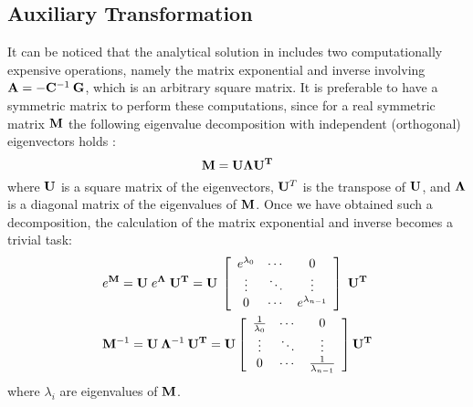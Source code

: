 \subsection{Auxiliary Transformation} \label{sec:ce-auxiliary}
It can be noticed that the analytical solution in  includes two computationally expensive operations, namely the matrix exponential and inverse involving \mbox{$\mathbf{A} = - \mathbf{C}^{-1} \: \mathbf{G}$}, which is an arbitrary square matrix. It is preferable to have a symmetric matrix to perform these computations, since for a real symmetric matrix $\mathbf{M}$ the following eigenvalue decomposition with independent (orthogonal) eigenvectors holds \cite{press2007}:
\begin{equation} \label{eq:eigenvalue-decomposition}
  \mathbf{M} = \mathbf{U} \mathbf{\Lambda} \mathbf{U}^{\mathbf{T}}
\end{equation}
where $\mathbf{U}$ is a square matrix of the eigenvectors, $\mathbf{U}^T$ is the transpose of $\mathbf{U}$, and $\mathbf{\Lambda}$ is a diagonal matrix of the eigenvalues of $\mathbf{M}$. Once we have obtained such a decomposition, the calculation of the matrix exponential and inverse becomes a trivial task:
\begin{align*}
  & e^{\mathbf{M}} = \mathbf{U} \; e^{\mathbf{\Lambda}} \; \mathbf{U}^{\mathbf{T}} = \mathbf{U}\: \left[
      \begin{array}{ccc}
        e^{\lambda_0} & \cdots & 0 \\
        \vdots & \ddots & \vdots \\
        0 & \cdots & e^{\lambda_{n - 1}}
      \end{array}
    \right] \; \mathbf{U}^{\mathbf{T}} \\
  & \mathbf{M}^{-1} = \mathbf{U} \: \mathbf{\Lambda}^{-1} \: \mathbf{U}^{\mathbf{T}} = \mathbf{U} \left[
      \begin{array}{ccc}
        \frac{1}{\lambda_0} & \cdots & 0 \\
        \vdots & \ddots & \vdots \\
        0 & \cdots & \frac{1}{\lambda_{n - 1}}
      \end{array}
    \right] \mathbf{U}^{\mathbf{T}} \\
\end{align*}
where $\lambda_i$ are eigenvalues of $\mathbf{M}$.

